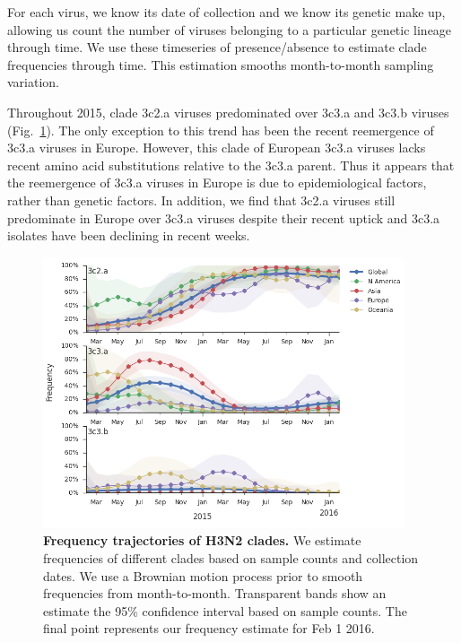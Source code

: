 \documentclass[11pt,oneside,letterpaper]{article}
\begin{document}
For each virus, we know its date of collection and we know its genetic make up, allowing us count the number of viruses belonging to a particular genetic lineage through time. We use these timeseries of presence/absence to estimate clade frequencies through time. This estimation smooths month-to-month sampling variation.

\pagebreak

Throughout 2015, clade 3c2.a viruses predominated over 3c3.a and 3c3.b viruses (Fig.\ \ref{H3N2_clades}). The only exception to this trend has been the recent reemergence of 3c3.a viruses in Europe. However, this clade of European 3c3.a viruses lacks recent amino acid substitutions relative to the 3c3.a parent. Thus it appears that the reemergence of 3c3.a viruses in Europe is due to epidemiological factors, rather than genetic factors. In addition, we find that 3c2.a viruses still predominate in Europe over 3c3.a viruses despite their recent uptick and 3c3.a isolates have been declining in recent weeks.

\begin{figure}[H]
	\centering		
	\includegraphics[width=0.95\textwidth]{../figures/feb-2016/H3N2_clades.png}
	\caption{\textbf{Frequency trajectories of H3N2 clades.}
	We estimate frequencies of different clades based on sample counts and collection dates.
	We use a Brownian motion process prior to smooth frequencies from month-to-month.
	Transparent bands show an estimate the 95\% confidence interval based on sample counts.
	The final point represents our frequency estimate for Feb 1 2016.
	}
	\label{H3N2_clades}
\end{figure}
\end{document}

